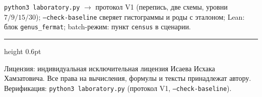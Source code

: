 \documentclass[11pt,a4paper]{article}
\theoremstyle{plain}
\theoremstyle{definition}
\theoremstyle{remark}
\begin{document}
\begin{verifybox}
\texttt{python3 laboratory.py} $\to$ протокол V1 (перепись,
две схемы, уровни $7/9/15/30$); \texttt{--check-baseline}
сверяет гистограммы и роды с эталоном; Lean: блок
\texttt{genus\_fermat}; batch-режим: пункт \texttt{census}
в сценарии.
\end{verifybox}

\vfill
{\color{linkblue}\hrule height 0.6pt}
\vspace{0.5em}
{\small\color{gray}
Лицензия: индивидуальная исключительная лицензия Исаева Исхака Хамзатовича.
Все права на вычисления, формулы и тексты принадлежат автору.
Верификация: \texttt{python3 laboratory.py} (протокол V1, \texttt{--check-baseline}).
}
\end{document}
